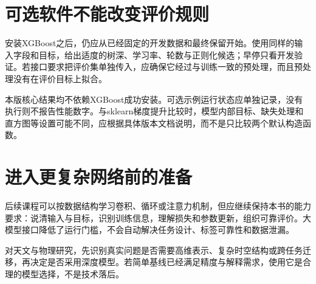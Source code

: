 
\section{可选软件不能改变评价规则}
安装XGBoost之后，仍应从已经固定的开发数据和最终保留开始。使用同样的输入字段和目标，给出适度的树深、学习率、轮数与正则化候选；早停只看开发验证。若接口要求把评价集单独传入，应确保它经过与训练一致的预处理，而且预处理没有在评价目标上拟合。

本版核心结果均不依赖XGBoost成功安装。可选示例运行状态应单独记录，没有执行则不报告性能数字。与sklearn梯度提升比较时，模型内部目标、缺失处理和直方图等设置可能不同，应根据具体版本文档说明，而不是只比较两个默认构造函数。

\section{进入更复杂网络前的准备}
后续课程可以按数据结构学习卷积、循环或注意力机制，但应继续保持本书的能力要求：说清输入与目标，识别训练信息，理解损失和参数更新，组织可靠评价。大模型接口降低了运行门槛，不会自动解决任务设计、标签可靠性和数据泄漏。

对天文与物理研究，先识别真实问题是否需要高维表示、复杂时空结构或跨任务迁移，再决定是否采用深度模型。若简单基线已经满足精度与解释需求，使用它是合理的模型选择，不是技术落后。
